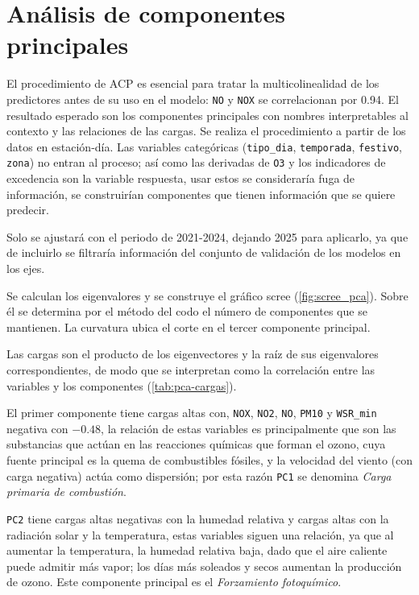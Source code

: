 \section{Análisis de componentes principales}
\label{sec:pca}

El procedimiento de ACP es esencial para tratar la multicolinealidad de los predictores antes de su uso en el modelo: \texttt{NO} y \texttt{NOX} se correlacionan por 0.94. El resultado esperado son los componentes principales con nombres interpretables al contexto y las relaciones de las cargas. Se realiza el procedimiento a partir de los datos en estación-día.
Las variables categóricas (\texttt{tipo\_dia}, \texttt{temporada}, \texttt{festivo}, \texttt{zona}) no entran al proceso; así como las derivadas de \texttt{O3} y los indicadores de excedencia son la variable respuesta, usar estos se consideraría fuga de información, se construirían componentes que tienen información que se quiere predecir.

Solo se ajustará con el periodo de 2021-2024, dejando 2025 para aplicarlo, ya que de incluirlo se filtraría información del conjunto de validación de los modelos en los ejes.

Se calculan los eigenvalores y se construye el gráfico scree (\cref{fig:scree_pca}). Sobre él se determina por el método del codo el número de componentes que se mantienen. La curvatura ubica el corte en el tercer componente principal.

Las cargas son el producto de los eigenvectores y la raíz de sus eigenvalores correspondientes, de modo que se interpretan como la correlación entre las variables y los componentes (\cref{tab:pca-cargas}).

El primer componente tiene cargas altas con, \texttt{NOX}, \texttt{NO2}, \texttt{NO}, \texttt{PM10} y \texttt{WSR\_min} negativa con $-0.48$, la relación de estas variables es principalmente que son las substancias que actúan en las reacciones químicas que forman el ozono, cuya fuente principal es la quema de combustibles fósiles, y la velocidad del viento (con carga negativa) actúa como dispersión; por esta razón \texttt{PC1} se denomina \textit{Carga primaria de combustión}.

\texttt{PC2} tiene cargas altas negativas con la humedad relativa y cargas altas con la radiación solar y la temperatura, estas variables siguen una relación, ya que al aumentar la temperatura, la humedad relativa baja, dado que el aire caliente puede admitir más vapor; los días más soleados y secos aumentan la producción de ozono. Este componente principal es el \textit{Forzamiento fotoquímico}.

